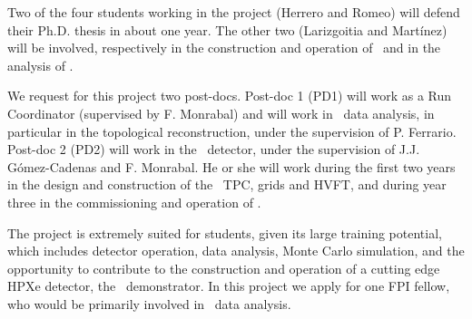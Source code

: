 Two of the four students working in the project (Herrero and Romeo) will defend their Ph.D. thesis in about one year. The other two (Larizgoitia and Mart\'inez) will be involved, respectively in the construction and operation of \HDEMO\ and in the analysis of \Next. 

We request for this project two post-docs. Post-doc 1 (PD1) will work as a Run Coordinator (supervised by F. Monrabal) and will work in \Next\ data analysis, in particular in the topological reconstruction, under the supervision of P. Ferrario. Post-doc 2 (PD2) will work in the \HDEMO\ detector, under the supervision of J.J. G\'omez-Cadenas and F. Monrabal. He or she will work during the first two years in the design and construction of the
\HDEMO\ TPC, grids and HVFT, and during year three in the commissioning and operation of \NHD. 

The project is extremely suited for students, given its large training potential, which includes detector operation, data analysis, Monte Carlo simulation, and the opportunity to contribute to the construction and operation of a cutting edge HPXe detector, the \HDEMO\ demonstrator. In this project we apply for one FPI fellow, who would be primarily involved in \Next\ data analysis. 
